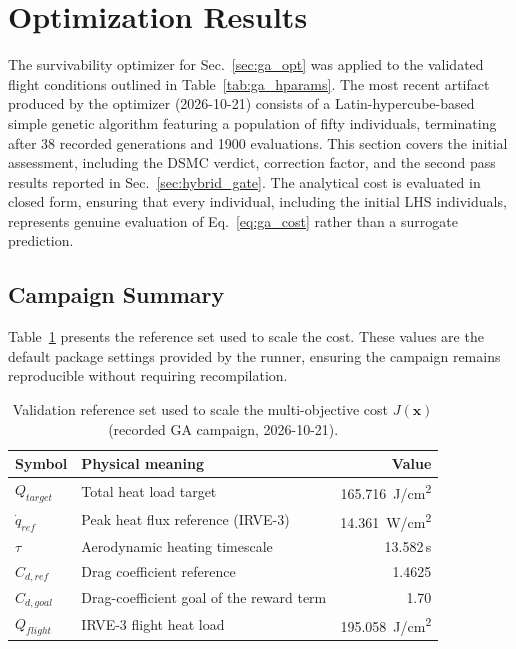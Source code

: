 \section{Optimization Results}
\label{sec:optimization_results}

The survivability optimizer for Sec.~\ref{sec:ga_opt} was applied to the validated flight conditions outlined in Table~\ref{tab:ga_hparams}. The most recent artifact produced by the optimizer (2026-10-21) consists of a Latin-hypercube-based simple genetic algorithm featuring a population of fifty individuals, terminating after 38 recorded generations and 1900 evaluations. This section covers the initial assessment, including the DSMC verdict, correction factor, and the second pass results reported in Sec.~\ref{sec:hybrid_gate}. The analytical cost is evaluated in closed form, ensuring that every individual, including the initial LHS individuals, represents genuine evaluation of Eq.~\eqref{eq:ga_cost} rather than a surrogate prediction.

\subsection{Campaign Summary}
Table~\ref{tab:ga_reference} presents the reference set used to scale the cost. These values are the default package settings provided by the runner, ensuring the campaign remains reproducible without requiring recompilation.

\begin{table}[H]
    \centering
    \caption{Validation reference set used to scale the multi-objective cost $J(\mathbf{x})$ (recorded GA campaign, 2026-10-21).}
    \label{tab:ga_reference}
    \begin{tabular}{llr}
        \toprule
        \textbf{Symbol} & \textbf{Physical meaning} & \textbf{Value} \\
        \midrule
        $Q_{target}$ & Total heat load target & 165.716~J/cm\textsuperscript{2} \\
        $\dot{q}_{ref}$  & Peak heat flux reference (IRVE-3) & 14.361~W/cm\textsuperscript{2} \\
        $\tau$           & Aerodynamic heating timescale & 13.582\,s \\
        $C_{d,ref}$      & Drag coefficient reference & 1.4625 \\
        $C_{d,goal}$     & Drag-coefficient goal of the reward term & 1.70 \\
        $Q_{flight}$     & IRVE-3 flight heat load & 195.058~J/cm\textsuperscript{2} \\
        \bottomrule
    \end{tabular}
\end{table}

